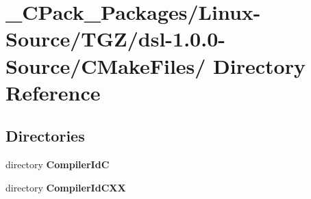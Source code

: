 \section{\_\-CPack\_\-Packages/Linux-\/Source/TGZ/dsl-\/1.0.0-\/Source/CMakeFiles/ Directory Reference}
\label{dir_8d367577259cc1db8dfd453e68faf7a7}
\subsection*{Directories}
\begin{DoxyCompactItemize}
\item 
directory {\bf CompilerIdC}
\item 
directory {\bf CompilerIdCXX}
\end{DoxyCompactItemize}
